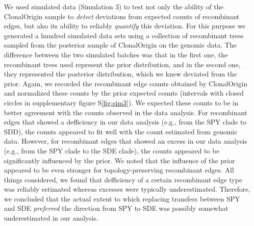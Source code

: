\documentclass[12pt]{article}
\begin{document}
We used simulated data (Simulation 3) to test not only the ability of the ClonalOrigin
sample to \textit{detect} deviations from expected counts of recombinant edges, but
also its ability to reliably \textit{quantify} this deviation.  For this purpose we
generated a hundred simulated data sets using a collection of recombinant trees
sampled from the posterior sample of ClonalOrigin on the genomic data.  The
difference between the two simulated batches was that in the first one, the
recombinant trees used represent the prior distribution, and in the second one,
they represented the posterior distribution, which we knew deviated from the
prior. Again, we recorded the recombinant edge counts obtained by ClonalOrigin
and normalized these counts by the prior expected counts (intervals with closed
circles in supplementary figure S\ref{fig:sim3}). We expected these counts to be
in better agreement with
the counts observed in the data analysis. For recombinant edges that showed a
defficiency in our data analysis (e.g., from the SPY clade to SDD), the counts
appeared to fit well with the count estimated from genomic data. However, for
recombinant edges that showed an excess in our data analysis (e.g., from the SPY
clade to the SDE clade), the counts appeared to be significantly influenced by the
prior. We noted that the influence of the prior appeared to be even stronger for
topology-preserving recombinant edges. All things considered, we found that defficiency of
a certain recombinant edge type was reliably estimated whereas excesses were 
typically underestimated. Therefore, we concluded that the actual extent to which
replacing transfers between SPY and SDE \textit{preferred} the direction from SPY to
SDE was possibly somewhat underestimated in our analysis.
\end{document}
